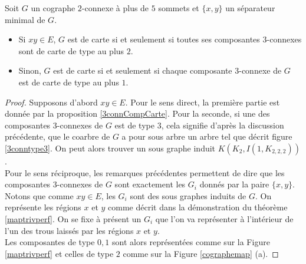 \documentclass{scrartcl}
\begin{document}
\begin{flushleft}
\begin{theorem}\label{cographe2conn}
    Soit $G$ un cographe $2$-connexe à plus de $5$ sommets et $\{x,y\}$ un séparateur minimal de $G$. 
    \begin{itemize}
        \item Si $xy \in E$, $G$ est de carte si et seulement si toutes ses composantes $3$-connexes sont de carte de type au plus $2$.
        \item Sinon, $G$ est de carte si et seulement si chaque composante $3$-connexe de $G$ est de carte de type au plus $1$.
    \end{itemize}
\end{theorem}

\begin{proof}
    Supposons d'abord $xy \in E$. Pour le sens direct, la première partie est donnée par la proposition \ref{3connCompCarte}. Pour la seconde,
    si une des composantes $3$-connexes de $G$ est de type $3$, cela signifie d'après la discussion précédente, que le coarbre de $G$
    a pour sous arbre un arbre tel que décrit figure \ref{3conntype3}. On peut alors trouver un sous graphe induit $K(K_2, I(1, K_{2,2,2}))$.\\
    Pour le sens réciproque, les remarques précédentes permettent de dire que les composantes $3$-connexes de $G$ sont exactement les $G_i$
    donnés par la paire $\{x,y\}$. Notons que comme $xy \in E$, les $G_i$ sont des sous graphes induits de $G$. On représente les régions $x$ et
    $y$ comme décrit dans la démonstration du théorème \ref{maptrivperf}. On se fixe à présent un $G_i$ que l'on va représenter à l'intérieur de
    l'un des trous laissés par les régions $x$ et $y$.\\
    Les composantes de type $0,1$ sont alors représentées comme sur la Figure \ref{maptrivperf} et celles de type $2$ comme sur la
    Figure \ref{cographemap} (a).


\end{proof}
\end{flushleft}
\end{document}
